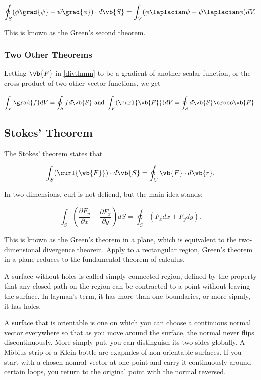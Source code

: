 \documentclass[english,a4paper,12pt]{report}
\begin{document}
\begin{equation}
	\oint_{S} (\phi \grad{\psi } - \psi \grad{\phi } ) \cdot d\vb{S}  = \int_{V}^{} (\phi \laplacian \psi - \psi \laplacian \phi ) dV. 
\end{equation}

This is known as the Green's second theorem.

\subsubsection{Two Other Theorems}

Letting \(\vb{F} \) in \cref{divthmm} to be a gradient of another scalar function, or the cross product of two other vector functions, we get 

\begin{equation}
	\int_{V}^{} \grad{f} dV = \oint_{S} fd\vb{S} \text { and } \int_{V}^{} (\curl{\vb{F} }) dV = \oint_{S} d\vb{S} \cross \vb{F} .     
\end{equation}

\subsection{Stokes' Theorem}
The Stokes' theorem states that 

\begin{equation} \label{stothmm} 
	\int_{S}^{} (\curl{\vb{F} } ) \cdot d\vb{S}  = \oint_{C} \vb{F} \cdot d\vb{r} .
\end{equation}

In two dimensions, curl is not defiend, but the main idea stands:

\begin{equation}
	\int_{S}^{} \left( \frac{\partial F_{y} }{\partial x} - \frac{\partial F_{x} }{\partial y}  \right) dS = \oint_{C} (F_{x} dx+F_{y} dy). 
\end{equation}

This is known as the Green's theorem in a plane, which is equivalent to the two-dimensional divergence theorem. Apply to a rectangular region, Green's theorem in a plane reduces to the fundamental theorem of calculus.

A surface without holes is called simply-connected region, defined by the property that any closed path on the region can be contracted to a point without leaving the surface. In layman's term, it has more than one boundaries, or more sipmly, it has holes.

A surface that is orientable is one on which you can choose a continuous normal vector everywhere so that as you move around the surface, the normal never flips discontinuously. More simply put, you can distinguish its two-sides globally. A Möbius strip or a Klein bottle are exapmles of non-orientable surfaces. If you start with a chosen nomral vector at one point and carry it continuously around certain loops, you return to the original point with the normal reversed.
\end{document}
